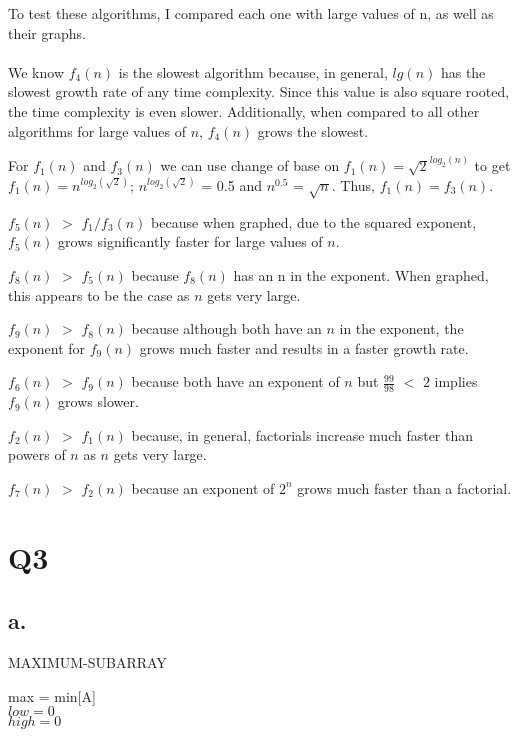 \documentclass[12pt]{article}
\begin{document}
\par
To test these algorithms, I compared each one with large values of n, as well as their graphs.\\ \\
We know $f_4(n)$ is the slowest algorithm because, in general, $lg(n)$ has the slowest growth rate of any time complexity. Since this value is also square rooted, the time complexity is even slower. Additionally, when compared to all other algorithms for large values of $n$, $f_4(n)$ grows the slowest. \par
For $f_1(n)$ and $f_3(n)$ we can use change of base on $f_1(n) = \sqrt{2}^{log_2(n)}$ to get $f_1(n) = n^{log_2(\sqrt{2})}$; $n^{log_2(\sqrt{2})}$ = 0.5 and $n^{0.5}$ = $\sqrt{n}$. Thus, $f_1(n) = f_3(n)$. \par$f_5(n)$ $>$ $f_1/f_3(n)$ because when graphed, due to the squared exponent, $f_5(n)$ grows significantly faster for large values of $n$.  

$f_8(n)$ $>$ $f_5(n)$ because $f_8(n)$ has an n in the exponent. When graphed, this appears to be the case as $n$ gets very large. \par

$f_9(n)$ $>$ $f_8(n)$ because although both have an $n$ in the exponent, the exponent for $f_9(n)$ grows much faster and results in a faster growth rate. \par

$f_6(n)$ $>$ $f_9(n)$ because both have an exponent of $n$ but $\frac{99}{98}$ $<$ $2$ implies $f_9(n)$ grows slower. \par

$f_2(n)$ $>$ $f_1(n)$ because, in general, factorials increase much faster than powers of $n$ as $n$ gets very large. \par

$f_7(n)$ $>$ $f_2(n)$ because an exponent of $2^n$ grows much faster than a factorial.      
   
\section{Q3}
\subsection{a.}

MAXIMUM-SUBARRAY 

\setlength{\parindent}{15pt}
max = min[A]\\
\indent $low = 0$\\
\indent $high = 0$
\end{document}
